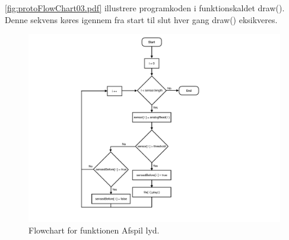 \autoref{fig:protoFlowChart03.pdf} illustrere programkoden i funktionskaldet draw(). Denne sekvens køres igennem fra start til slut hver gang draw() eksikveres.            

\begin{figure}[H]
\centering
\includegraphics[scale=0.6]{Figure/protoFlowChart03.pdf}
\caption{
Flowchart for funktionen Afspil lyd. }
\label{fig:protoFlowChart03.pdf}
\end{figure}

 